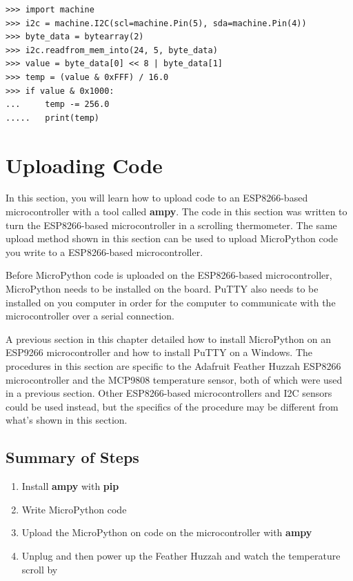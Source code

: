 \documentclass{book}
\providecommand{\tightlist}{%
      \setlength{\itemsep}{0pt}\setlength{\parskip}{0pt}}
\begin{document}
\begin{lstlisting}
>>> import machine
>>> i2c = machine.I2C(scl=machine.Pin(5), sda=machine.Pin(4))
>>> byte_data = bytearray(2)
>>> i2c.readfrom_mem_into(24, 5, byte_data)
>>> value = byte_data[0] << 8 | byte_data[1]
>>> temp = (value & 0xFFF) / 16.0
>>> if value & 0x1000:
...     temp -= 256.0
.....   print(temp)
\end{lstlisting}
    




    
        \section{Uploading Code}\label{uploading-code}
    




    
        In this section, you will learn how to upload code to an ESP8266-based
microcontroller with a tool called \textbf{ampy}. The code in this
section was written to turn the ESP8266-based microcontroller in a
scrolling thermometer. The same upload method shown in this section can
be used to upload MicroPython code you write to a ESP8266-based
microcontroller.

Before MicroPython code is uploaded on the ESP8266-based
microcontroller, MicroPython needs to be installed on the board. PuTTY
also needs to be installed on you computer in order for the computer to
communicate with the microcontroller over a serial connection.

A previous section in this chapter detailed how to install MicroPython
on an ESP9266 microcontroller and how to install PuTTY on a Windows. The
procedures in this section are specific to the Adafruit Feather Huzzah
ESP8266 microcontroller and the MCP9808 temperature sensor, both of
which were used in a previous section. Other ESP8266-based
microcontrollers and I2C sensors could be used instead, but the
specifics of the procedure may be different from what's shown in this
section.
    




    
        \subsection{Summary of Steps}\label{summary-of-steps}
    




    
        \begin{enumerate}
\def\labelenumi{\arabic{enumi}.}
\tightlist
\item
  Install \textbf{ampy} with \textbf{pip}
\item
  Write MicroPython code
\item
  Upload the MicroPython on code on the microcontroller with
  \textbf{ampy}
\item
  Unplug and then power up the Feather Huzzah and watch the temperature
  scroll by
\end{enumerate}
    
\end{document}
